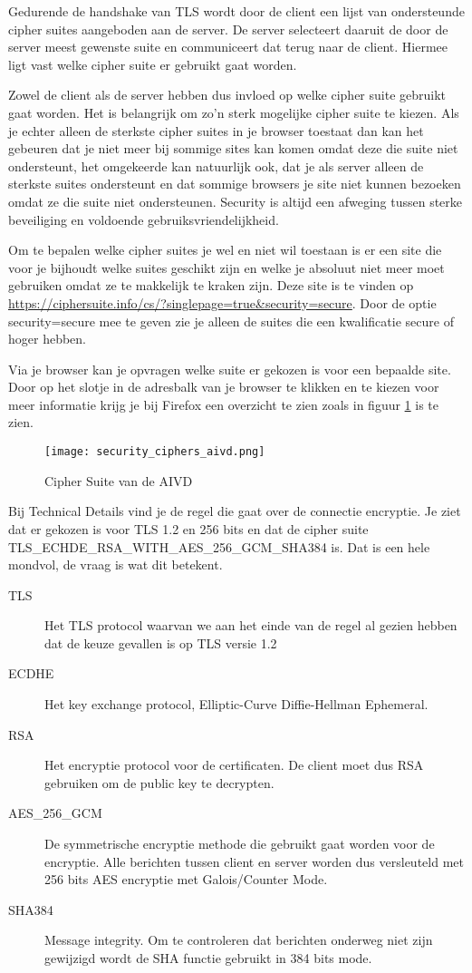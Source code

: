 Gedurende de handshake van TLS wordt door de client een lijst van ondersteunde cipher suites aangeboden aan de server. De server selecteert daaruit de door de server meest gewenste suite en communiceert dat terug naar de client. Hiermee ligt vast welke cipher suite er gebruikt gaat worden.

Zowel de client als de server hebben dus invloed op welke cipher suite gebruikt gaat worden. Het is belangrijk om zo'n sterk mogelijke cipher suite te kiezen. Als je echter alleen de sterkste cipher suites in je browser toestaat dan kan het gebeuren dat je niet meer bij sommige sites kan komen omdat deze die suite niet ondersteunt, het omgekeerde kan natuurlijk ook, dat je als server alleen de sterkste suites ondersteunt en dat sommige browsers je site niet kunnen bezoeken omdat ze die suite niet ondersteunen. Security is altijd een afweging tussen sterke beveiliging en voldoende gebruiksvriendelijkheid.

Om te bepalen welke cipher suites je wel en niet wil toestaan is er een site die voor je bijhoudt welke suites geschikt zijn en welke je absoluut niet meer moet gebruiken omdat ze te makkelijk te kraken zijn. Deze site is te vinden op \url{https://ciphersuite.info/cs/?singlepage=true&security=secure}. Door de optie security=secure mee te geven zie je alleen de suites die een kwalificatie secure of hoger hebben.

Via je browser kan je opvragen welke suite er gekozen is voor een bepaalde site. Door op het slotje in de adresbalk van je browser te klikken en te kiezen voor meer informatie krijg je bij Firefox een overzicht te zien zoals in figuur \ref{fig:CipherAIVD} is te zien.

\begin{figure}[htbp]
	\texttt{[image: security\_ciphers\_aivd.png]}
	\caption{Cipher Suite van de AIVD}
	\label{fig:CipherAIVD}
\end{figure}

Bij Technical Details vind je de regel die gaat over de connectie encryptie. Je ziet dat er gekozen is voor TLS 1.2 en 256 bits en dat de cipher suite TLS\_ECHDE\_RSA\_WITH\_AES\_256\_GCM\_SHA384 is. Dat is een hele mondvol, de vraag is wat dit betekent.

\goodbreak
\begin{description}
	\item[TLS] Het TLS protocol waarvan we aan het einde van de regel al gezien hebben dat de keuze gevallen is op TLS versie 1.2
	\item[ECDHE] Het key exchange protocol, Elliptic-Curve Diffie-Hellman Ephemeral.
	\item[RSA] Het encryptie protocol voor de certificaten. De client moet dus RSA gebruiken om de public key te decrypten.
	\item[AES\_256\_GCM] De symmetrische encryptie methode die gebruikt gaat worden voor de encryptie. Alle berichten tussen client en server worden dus versleuteld met 256 bits AES encryptie met Galois/Counter Mode.
	\item[SHA384] Message integrity. Om te controleren dat berichten onderweg niet zijn gewijzigd wordt de SHA functie gebruikt in 384 bits mode.
\end{description}

